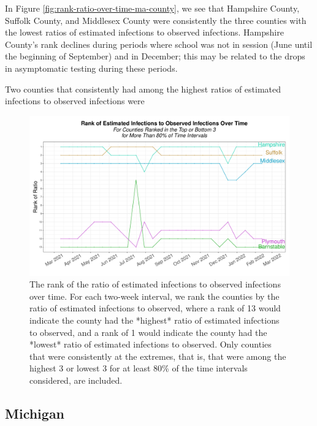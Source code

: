 \documentclass[12pt,twoside]{smiththesis}
\begin{document}
In Figure \ref{fig:rank-ratio-over-time-ma-county}, we see that Hampshire County, Suffolk County, and Middlesex County were consistently the three counties with the lowest ratios of estimated infections to observed infections. Hampshire County's rank declines during periods where school was not in session (June until the beginning of September) and in December; this may be related to the drops in asymptomatic testing during these periods.

Two counties that consistently had among the highest ratios of estimated infections to observed infections were
\begin{figure}
\includegraphics[width=1\linewidth]{figure/rank-ratio-over-time-ma-county} \caption{\label{fig:rank-ratio-over-time-ma-county}The rank of the ratio of estimated infections to observed infections over time. For each two-week interval, we rank the counties by the ratio of estimated infections to observed, where a rank of 13 would indicate the county had the *highest* ratio of estimated infections to observed, and a rank of 1   would indicate the county had the *lowest* ratio of estimated infections to observed. Only counties that were consistently at the extremes, that is, that were among the highest 3 or lowest 3 for at least 80\% of the time intervals considered, are included.}\label{fig:unnamed-chunk-24}
\end{figure}
\hypertarget{michigan}{%
\subsection{Michigan}\label{michigan}}
\end{document}
